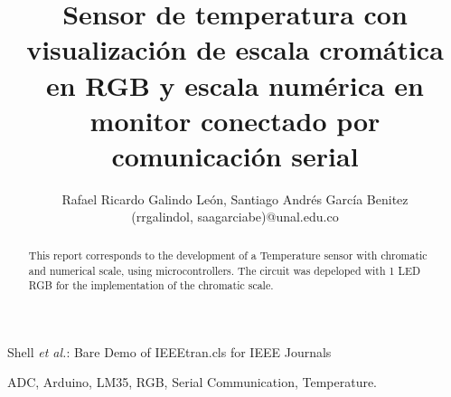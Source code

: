 \documentclass[journal]{IEEEtran}
\begin{document}
\title{Sensor de temperatura con visualización de escala cromática en RGB y escala numérica en monitor conectado por comunicación serial}
\author{Rafael Ricardo Galindo León, Santiago Andrés García Benitez\\
        (rrgalindol, saagarciabe)@unal.edu.co}

{Shell \MakeLowercase{\textit{et al.}}: Bare Demo of IEEEtran.cls for IEEE Journals}

\maketitle
\begin{otherlanguage}{english} 
\begin{abstract}
This report corresponds to the development of a Temperature sensor with chromatic and numerical scale, using microcontrollers. The circuit was depeloped with 1 LED RGB for the implementation of the chromatic scale.
\end{abstract}
\begin{IEEEkeywords}
ADC, Arduino, LM35, RGB, Serial Communication, Temperature.
\end{IEEEkeywords}
\end{otherlanguage}
\IEEEpeerreviewmaketitle
\end{document}
